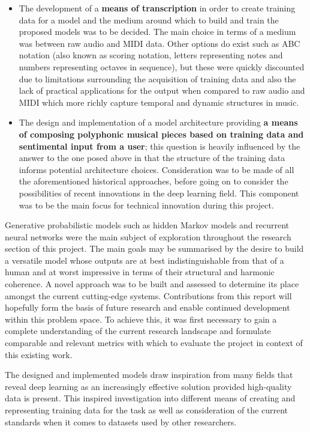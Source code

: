\documentclass[12pt,]{article}
\providecommand{\tightlist}{%
  \setlength{\itemsep}{0pt}\setlength{\parskip}{0pt}}
\begin{document}
\begin{itemize}
\tightlist
\item
  The development of a \textbf{means of transcription} in order to
  create training data for a model and the medium around which to build
  and train the proposed models was to be decided. The main choice in
  terms of a medium was between raw audio and MIDI data. Other options
  do exist such as ABC notation (also known as scoring notation, letters
  representing notes and numbers representing octaves in sequence), but
  these were quickly discounted due to limitations surrounding the
  acquisition of training data and also the lack of practical
  applications for the output when compared to raw audio and MIDI which
  more richly capture temporal and dynamic structures in music.
\item
  The design and implementation of a model architecture providing
  \textbf{a means of composing polyphonic musical pieces based on
  training data and sentimental input from a user}; this question is
  heavily influenced by the answer to the one posed above in that the
  structure of the training data informs potential architecture choices.
  Consideration was to be made of all the aforementioned historical
  approaches, before going on to consider the possibilities of recent
  innovations in the deep learning field. This component was to be the
  main focus for technical innovation during this project.
\end{itemize}

Generative probabilistic models such as hidden Markov models and
recurrent neural networks were the main subject of exploration
throughout the research section of this project. The main goals may be
summarised by the desire to build a versatile model whose outputs are at
best indistinguishable from that of a human and at worst impressive in
terms of their structural and harmonic coherence. A novel approach was
to be built and assessed to determine its place amongst the current
cutting-edge systems. Contributions from this report will hopefully form
the basis of future research and enable continued development within
this problem space. To achieve this, it was first necessary to gain a
complete understanding of the current research landscape and formulate
comparable and relevant metrics with which to evaluate the project in
context of this existing work.

The designed and implemented models draw inspiration from many fields
that reveal deep learning as an increasingly effective solution provided
high-quality data is present. This inspired investigation into different
means of creating and representing training data for the task as well as
consideration of the current standards when it comes to datasets used by
other researchers.
\end{document}
